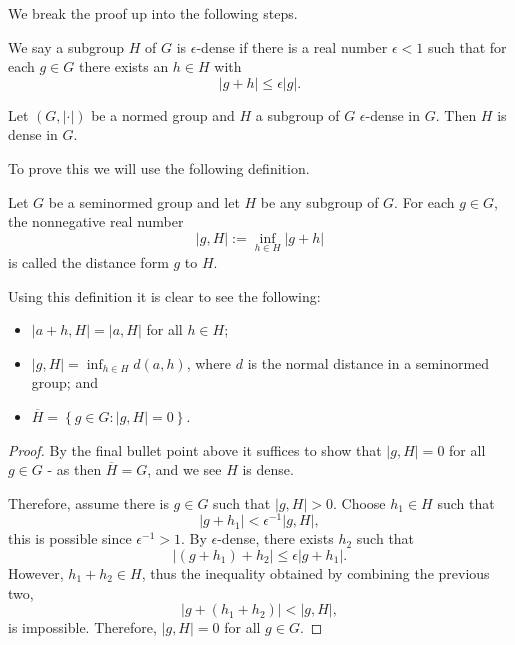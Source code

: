 We break the proof up into the following steps.

\begin{definition}
  We say a subgroup $H$ of $G$ is $\epsilon$-dense if there is a real number $\epsilon < 1$ such that
  for each $g \in G$ there exists an $h \in H$ with
  \[
    \lvert g + h \rvert \leq \epsilon \lvert g \rvert.
  \]
\end{definition}

\begin{lemma}
  Let $(G, \lvert \cdot \rvert)$ be a normed group and $H$ a subgroup of $G$ $\epsilon$-dense in $G$.
  Then $H$ is dense in $G$.
\end{lemma}

To prove this we will use the following definition.

\begin{definition}
  Let $G$ be a seminormed group and let $H$ be any subgroup of $G$. For each $g \in G$, the nonnegative
  real number
  \[
  \lvert g, H \rvert := \inf_{h \in H} \lvert g + h \rvert
  \]
  is called the distance form $g$ to $H$.
\end{definition}

Using this definition it is clear to see the following:
\begin{itemize}
  \item $\lvert a + h, H \rvert = \lvert a, H \rvert$ for all $h \in H$;
  \item $\lvert g, H \rvert = \inf_{h \in H} d(a,h)$, where $d$ is the normal distance in a seminormed
    group; and
  \item $\overline{H} = \left\{ g \in G : \lvert g, H \rvert = 0 \right\}$.
\end{itemize}

\begin{proof}
  By the final bullet point above it suffices to show that $\lvert g, H \rvert = 0$ for all $g \in G$
  - as then $\overline{H} = G$, and we see $H$ is dense.

  Therefore, assume there is $g \in G$ such that $\lvert g, H \rvert > 0.$ Choose $h_1 \in H$ such that
  \[
    \lvert g + h_1 \rvert < \epsilon^{-1} \lvert g, H \rvert,
  \]
  this is possible since $\epsilon^{-1} > 1.$
  By $\epsilon$-dense, there exists $h_2$ such that
  \[
  \lvert (g + h_1) + h_2 \rvert \leq \epsilon \lvert g + h_1 \rvert.
  \]
  However, $h_1 + h_2 \in H$, thus the inequality obtained by combining the previous two,
  \[
    \lvert g + (h_1 + h_2) \rvert < \lvert g, H \rvert,
  \]
  is impossible. Therefore, $\lvert g, H \rvert = 0$ for all $g \in G$.
\end{proof}

